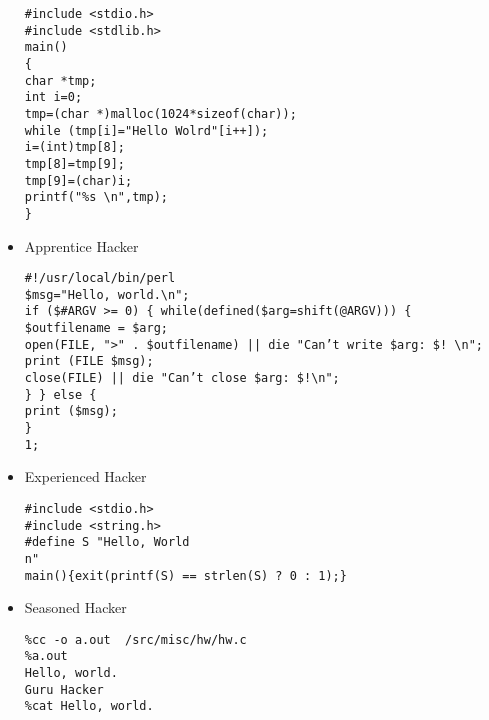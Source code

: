 \begin{itemize}
	\texttt{\#include <stdio.h>\\
	\#include <stdlib.h>\\
	main()\\
	\{\\
	char *tmp;\\
	int i=0;\\
	tmp=(char *)malloc(1024*sizeof(char));\\
	while (tmp[i]="Hello Wolrd"[i++]);\\
	i=(int)tmp[8];\\
	tmp[8]=tmp[9];\\
	tmp[9]=(char)i;\\
	printf("\%s \textbackslash n",tmp);\\
	\}\\
	}
	
		\item Apprentice Hacker
	
	\texttt{\#!/usr/local/bin/perl\\
	\$msg="Hello, world.\textbackslash n";\\
	if (\$\#ARGV >= 0) \{
	while(defined(\$arg=shift(@ARGV))) \{\\
	\$outfilename = \$arg;\\
	open(FILE, ">" . \$outfilename) || die "Can't write \$arg: \$! \textbackslash n";\\
	print (FILE \$msg);\\
	close(FILE) || die "Can't close \$arg: \$!\textbackslash n";\\
	\}
	\} else \{\\
	print (\$msg);\\
	\}\\
	1;}
	
		\item Experienced Hacker
	
	\texttt{\#include <stdio.h>\\
	\#include <string.h>\\
	\#define S "Hello, World\\n"\\
	main()\{exit(printf(S) == strlen(S) ? 0 : 1);\}}
	
		\item Seasoned Hacker
	
	\texttt{\%cc -o a.out ~/src/misc/hw/hw.c\\
	\%a.out\\
	Hello, world.\\
	Guru Hacker\\
	\%cat
	Hello, world.}
	

\end{itemize}
